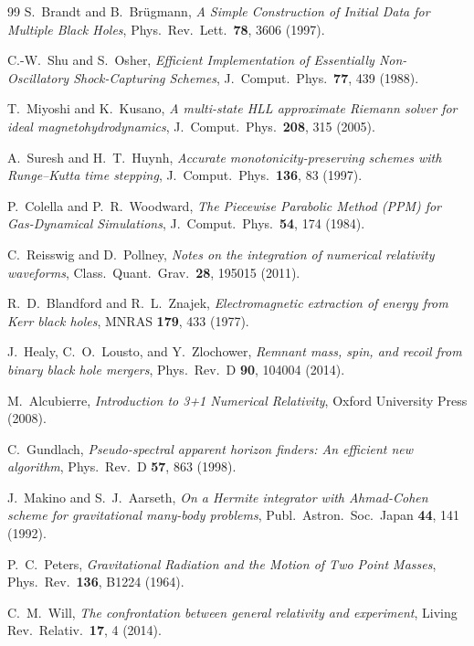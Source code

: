 \documentclass[aps,prd,twocolumn,superscriptaddress,nofootinbib,showpacs,
               longbibliography]{revtex4-2}
\begin{document}
\begin{thebibliography}{99}
S.~Brandt and B.~Br{\"u}gmann,
\emph{A Simple Construction of Initial Data for Multiple Black Holes},
Phys.\ Rev.\ Lett.\ \textbf{78}, 3606 (1997).

C.-W.~Shu and S.~Osher,
\emph{Efficient Implementation of Essentially Non-Oscillatory Shock-Capturing Schemes},
J.\ Comput.\ Phys.\ \textbf{77}, 439 (1988).

T.~Miyoshi and K.~Kusano,
\emph{A multi-state HLL approximate Riemann solver for ideal magnetohydrodynamics},
J.\ Comput.\ Phys.\ \textbf{208}, 315 (2005).

A.~Suresh and H.~T.~Huynh,
\emph{Accurate monotonicity-preserving schemes with Runge--Kutta time stepping},
J.\ Comput.\ Phys.\ \textbf{136}, 83 (1997).

P.~Colella and P.~R.~Woodward,
\emph{The Piecewise Parabolic Method (PPM) for Gas-Dynamical Simulations},
J.\ Comput.\ Phys.\ \textbf{54}, 174 (1984).

C.~Reisswig and D.~Pollney,
\emph{Notes on the integration of numerical relativity waveforms},
Class.\ Quant.\ Grav.\ \textbf{28}, 195015 (2011).

R.~D.~Blandford and R.~L.~Znajek,
\emph{Electromagnetic extraction of energy from Kerr black holes},
MNRAS \textbf{179}, 433 (1977).

J.~Healy, C.~O.~Lousto, and Y.~Zlochower,
\emph{Remnant mass, spin, and recoil from binary black hole mergers},
Phys.\ Rev.\ D \textbf{90}, 104004 (2014).

M.~Alcubierre,
\emph{Introduction to 3+1 Numerical Relativity},
Oxford University Press (2008).

C.~Gundlach,
\emph{Pseudo-spectral apparent horizon finders: An efficient new algorithm},
Phys.\ Rev.\ D \textbf{57}, 863 (1998).

J.~Makino and S.~J.~Aarseth,
\emph{On a Hermite integrator with Ahmad-Cohen scheme for gravitational many-body problems},
Publ.\ Astron.\ Soc.\ Japan \textbf{44}, 141 (1992).

P.~C.~Peters,
\emph{Gravitational Radiation and the Motion of Two Point Masses},
Phys.\ Rev.\ \textbf{136}, B1224 (1964).

C.~M.~Will,
\emph{The confrontation between general relativity and experiment},
Living Rev.\ Relativ.\ \textbf{17}, 4 (2014).

\end{thebibliography}
\end{document}
